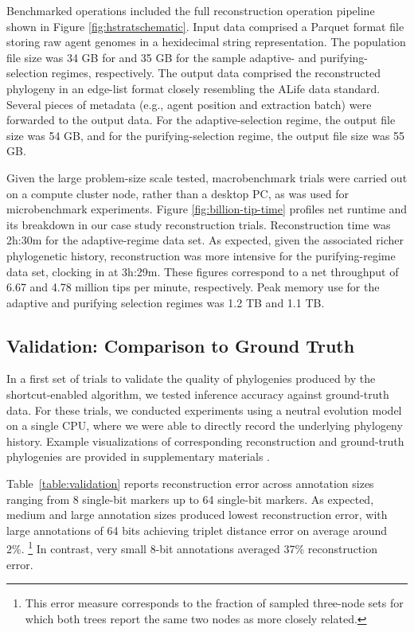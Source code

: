 Benchmarked operations included the full reconstruction operation pipeline shown in Figure \ref{fig:hstratschematic}.
Input data comprised a Parquet format file storing raw agent genomes in a hexidecimal string representation.
The population file size was 34 GB for and 35 GB for the sample adaptive- and purifying-selection regimes, respectively.
The output data comprised the reconstructed phylogeny in an edge-list format closely resembling the ALife data standard.
Several pieces of metadata (e.g., agent position and extraction batch) were forwarded to the output data.
For the adaptive-selection regime, the output file size was 54 GB, and for the purifying-selection regime, the output file size was 55 GB.

Given the large problem-size scale tested, macrobenchmark trials were carried out on a compute cluster node, rather than a desktop PC, as was used for microbenchmark experiments.
Figure \ref{fig:billion-tip-time} profiles net runtime and its breakdown in our case study reconstruction trials.
Reconstruction time was 2h:30m for the adaptive-regime data set.
As expected, given the associated richer phylogenetic history, reconstruction was more intensive for the purifying-regime data set, clocking in at 3h:29m.
These figures correspond to a net throughput of 6.67 and 4.78 million tips per minute, respectively.
Peak memory use for the adaptive and purifying selection regimes was 1.2 TB and 1.1 TB.

\subsection{Validation: Comparison to Ground Truth}

In a first set of trials to validate the quality of phylogenies produced by the shortcut-enabled algorithm, we tested inference accuracy against ground-truth data.
For these trials, we conducted experiments using a neutral evolution model on a single CPU, where we were able to directly record the underlying phylogeny history.
Example visualizations of corresponding reconstruction and ground-truth phylogenies are provided in supplementary materials \citep{supplemental}.



Table~\ref{table:validation} reports reconstruction error across annotation sizes ranging from 8 single-bit markers up to 64 single-bit markers.
As expected, medium and large annotation sizes produced lowest reconstruction error, with large annotations of 64 bits achieving triplet distance error on average around 2\%.%
\footnote{This error measure corresponds to the fraction of sampled three-node sets for which both trees report the same two nodes as more closely related.}
In contrast, very small 8-bit annotations averaged 37\% reconstruction error.

